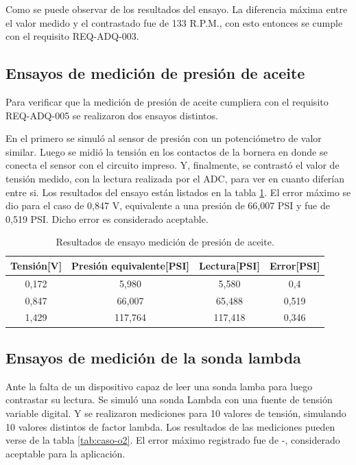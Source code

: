 Como se puede observar de los resultados del ensayo. La diferencia máxima entre el valor medido y el contrastado fue de 133 R.P.M., con esto entonces se cumple con el requisito REQ-ADQ-003.

\break

\subsection{Ensayos de medición de presión de aceite}

Para verificar que la medición de presión de aceite cumpliera con el requisito REQ-ADQ-005 se realizaron dos ensayos distintos.

En el primero se simuló al sensor de presión con un potenciómetro de valor similar. Luego se midió la tensión en los contactos de la bornera en donde se conecta el sensor con el circuito impreso. Y, finalmente, se contrastó el valor de tensión medido, con la lectura realizada por el ADC, para ver en cuanto diferían entre si. Los resultados del ensayo están listados en la tabla \ref{tab:ensayo-presion}. El error máximo se dio para el caso de 0,847 V, equivalente a una presión de 66,007 PSI y fue de 0,519 PSI. Dicho error es considerado aceptable. 

\begin{table}[htpb]
	\centering
	\caption{Resultados de ensayo medición de presión de aceite.}
	\centering
	\begin{tabular}{c c c c}    
		\toprule
		\textbf{Tensión[V]} & \textbf{Presión equivalente[PSI]} & \textbf{Lectura[PSI]} & \textbf{Error[PSI]}\\
		\midrule
		0,172		&   5,980 & 5,580 & 0,4 \\
		0,847		&   66,007 & 65,488 & 0,519 \\
		1,429		&   117,764 & 117,418 & 0,346 \\
		\bottomrule
	\end{tabular}
	\label{tab:ensayo-presion}
\end{table}

\subsection{Ensayos de medición de la sonda lambda}

Ante la falta de un dispositivo capaz de leer una sonda lamba para luego contrastar su lectura. Se simuló una sonda Lambda con una fuente de tensión variable digital. Y se realizaron mediciones para 10 valores de tensión, simulando 10 valores distintos de factor lambda. Los resultados de las mediciones pueden verse de la tabla \ref{tab:caso-o2}. El error máximo registrado fue de -, considerado aceptable para la aplicación.

